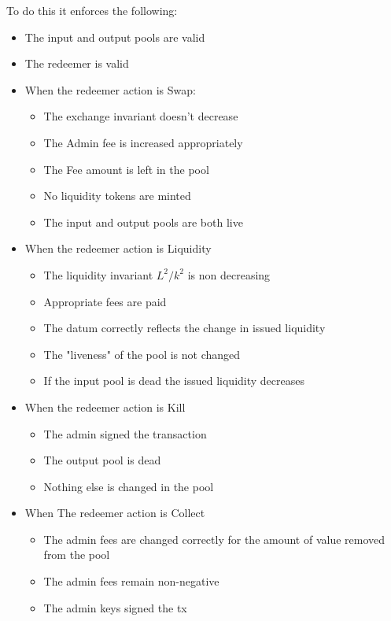 \documentclass{article}
\begin{document}
To do this it enforces the following:
\begin{itemize}
	\item The input and output pools are valid
	\item The redeemer is valid
	\item When the redeemer action is Swap:
		\begin{itemize}
			\item The exchange invariant doesn't decrease
			\item The Admin fee is increased appropriately
			\item The Fee amount is left in the pool
			\item No liquidity tokens are minted
			\item The input and output pools are both live
		\end{itemize}
	\item When the redeemer action is Liquidity
		\begin{itemize}
			\item The liquidity invariant $L^2/k^2$ is non decreasing
			\item Appropriate fees are paid
			\item The datum correctly reflects the change in issued liquidity
			\item The "liveness" of the pool is not changed
			\item If the input pool is dead the issued liquidity decreases
		\end{itemize}
	\item When the redeemer action is Kill
		\begin{itemize}
			\item The admin signed the transaction
			\item The output pool is dead
			\item Nothing else is changed in the pool
		\end{itemize}
	\item When The redeemer action is Collect
		\begin{itemize}
			\item The admin fees are changed correctly
				for the amount of value removed from the pool
			\item The admin fees remain non-negative
			\item The admin keys signed the tx
		\end{itemize}
\end{itemize}
\end{document}
